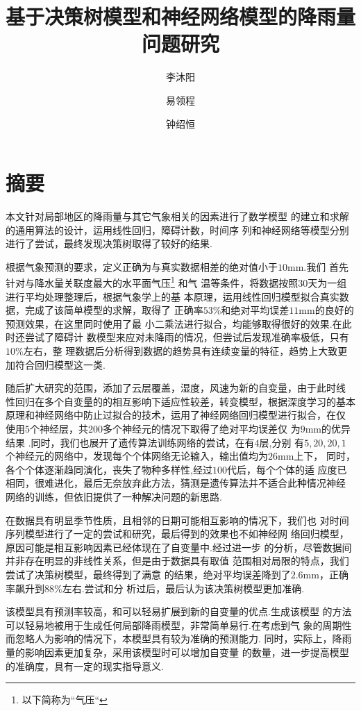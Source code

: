 \documentclass[UTF8, a4paper]{ctexart}
\title{基于决策树模型和神经网络模型的降雨量问题研究}
\author{李沐阳 \and 易领程 \and 钟绍恒}
\begin{document}
\maketitle



\section{摘要}

本文针对局部地区的降雨量与其它气象相关的因素进行了数学模型
的建立和求解的通用算法的设计，运用线性回归，障碍计数，时间序
列和神经网络等模型分别进行了尝试，最终发现决策树取得了较好的结果.

根据气象预测的要求，定义正确为与真实数据相差的绝对值小于$10$\si{\milli\meter}.我们
首先针对与降水量关联度最大的水平面气压\footnote{以下简称为``气压``} 和气
温等条件，将数据按照$30$天为一组进行平均处理整理后，根据气象学上的基
本原理，运用线性回归模型拟合真实数据，完成了该简单模型的求解，取得了
正确率$53 \%$和绝对平均误差$11$mm的良好的预测效果，在这里同时使用了最
小二乘法进行拟合，均能够取得很好的效果.在此时还尝试了障碍计
数模型来应对未降雨的情况，但尝试后发现准确率极低，只有$10\%$左右，整
理数据后分析得到数据的趋势具有连续变量的特征，趋势上大致更加符合回归模型这一类.

随后扩大研究的范围，添加了云层覆盖，湿度，风速为新的自变量，由于此时线
性回归在多个自变量的的相互影响下适应性较差，转变模型，根据深度学习的基本
原理和神经网络中防止过拟合的技术，运用了神经网络回归模型进行拟合，在仅
使用$5$个神经层，共$200$多个神经元的情况下取得了绝对平均误差仅
为$9$\si{\milli\meter}的优异结果 .同时，我们也展开了遗传算法训练网络的尝试，在有$4$层,分别
有$5,20,20,1$个神经元的网络中，发现每个个体网络无论输入，输出值均为$26$\si{\milli\meter}上下，
同时，各个个体逐渐趋同演化，丧失了物种多样性,经过$100$代后，每个个体的适
应度已相同，很难进化，最后无奈放弃此方法，猜测是遗传算法并不适合此种情况神经
网络的训练，但依旧提供了一种解决问题的新思路.

在数据具有明显季节性质，且相邻的日期可能相互影响的情况下，我们也
对时间序列模型进行了一定的尝试和研究，最后得到的效果也不如神经网
络回归模型，原因可能是相互影响因素已经体现在了自变量中.经过进一步
的分析，尽管数据间并非存在明显的非线性关系，但是由于数据具有取值
范围相对局限的特点，我们尝试了决策树模型，最终得到了满意
的结果，绝对平均误差降到了$2.6$mm，正确率飙升到$88\%$左右.尝试和分
析过后，最后认为该决策树模型更加准确.

该模型具有预测率较高，和可以轻易扩展到新的自变量的优点.生成该模型
的方法可以轻易地被用于生成任何局部降雨模型，非常简单易行.在考虑到气
象的周期性而忽略人为影响的情况下，本模型具有较为准确的预测能力.
同时，实际上，降雨量的影响因素更加复杂，采用该模型时可以增加自变量
的数量，进一步提高模型的准确度，具有一定的现实指导意义.
\end{document}
